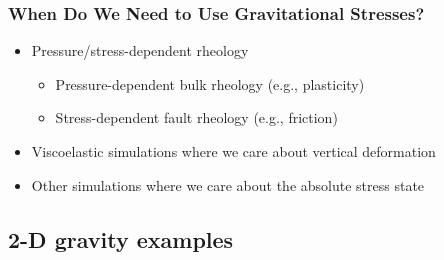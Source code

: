 \documentclass[aspectratio=169]{beamer}
\begin{document}
\begin{frame}
  \frametitle{When Do We Need to Use Gravitational Stresses?}
  \summary{}

  \begin{itemize}
  \item Pressure/stress-dependent rheology
    \begin{itemize}
    \item Pressure-dependent bulk rheology (e.g., plasticity)
    \item Stress-dependent fault rheology (e.g., friction)
    \end{itemize}
  \item Viscoelastic simulations where we care about vertical
    deformation
  \item Other simulations where we care about the absolute stress
    state
  \end{itemize}
  
\end{frame}

\subsection{2-D gravity examples}
\end{document}
